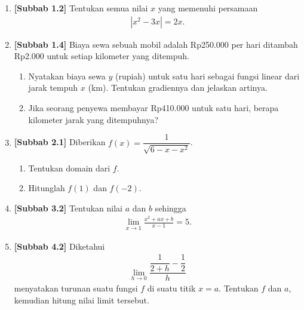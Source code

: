 \documentclass[10pt,openany,a4paper]{article}
\theoremstyle{definition}
\theoremstyle{definition}
\theoremstyle{plain}
\begin{document}
\newpage

\begin{enumerate}
    \item \textbf{[Subbab 1.2]} Tentukan semua nilai $x$ yang memenuhi persamaan
    \begin{align*}
        \left|x^2-3x\right|=2x.
    \end{align*}

    \item \textbf{[Subbab 1.4]} Biaya sewa sebuah mobil adalah Rp250.000 per hari ditambah Rp2.000 untuk setiap kilometer yang ditempuh.
    \begin{enumerate}
        \item Nyatakan biaya sewa $y$ (rupiah) untuk satu hari sebagai fungsi linear dari jarak tempuh $x$ (km). Tentukan gradiennya dan jelaskan artinya.
        \item Jika seorang penyewa membayar Rp410.000 untuk satu hari, berapa kilometer jarak yang ditempuhnya?
    \end{enumerate}

    \item \textbf{[Subbab 2.1]} Diberikan $f(x)=\dfrac{1}{\sqrt{6-x-x^2}}$.
    \begin{enumerate}
        \item Tentukan domain dari $f$.
        \item Hitunglah $f(1)$ dan $f(-2)$.
    \end{enumerate}

    \item \textbf{[Subbab 3.2]} Tentukan nilai $a$ dan $b$ sehingga
    \begin{align*}
        \lim_{x\to 1}\frac{x^2+ax+b}{x-1}=5.
    \end{align*}

    \item \textbf{[Subbab 4.2]} Diketahui
    \begin{align*}
        \lim_{h\to 0}\dfrac{\dfrac{1}{2+h}-\dfrac{1}{2}}{h}
    \end{align*}
    menyatakan turunan suatu fungsi $f$ di suatu titik $x=a$. Tentukan $f$ dan $a$, kemudian hitung nilai limit tersebut.
\end{enumerate}
\end{document}
